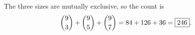 The three sizes are mutually exclusive, so the count is
\[\dbinom93+\dbinom95+\dbinom97=84+126+36=\boxed{246}.\]
